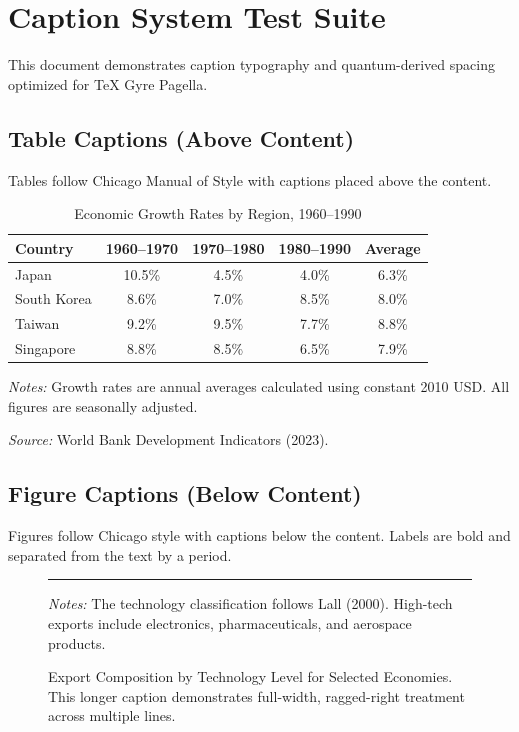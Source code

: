 \documentclass[11pt,a4paper]{article}
\begin{document}
\section{Caption System Test Suite}

This document demonstrates caption typography and quantum-derived spacing optimized for TeX Gyre Pagella.

\subsection{Table Captions (Above Content)}

Tables follow Chicago Manual of Style with captions placed above the content.

\begin{table}[tbp]
  \caption{Economic Growth Rates by Region, 1960–1990}
  \label{tab:growth-rates}
  \centering
  \begin{threeparttable}
    \begin{tabular}{@{}lcccc@{}}
      \toprule
      Country & 1960–1970 & 1970–1980 & 1980–1990 & Average \\
      \midrule
      Japan & 10.5\% & 4.5\% & 4.0\% & 6.3\% \\
      South Korea & 8.6\% & 7.0\% & 8.5\% & 8.0\% \\
      Taiwan & 9.2\% & 9.5\% & 7.7\% & 8.8\% \\
      Singapore & 8.8\% & 8.5\% & 6.5\% & 7.9\% \\
      \bottomrule
    \end{tabular}
    \begin{tablenotes}
      \item \emph{Notes:} Growth rates are annual averages calculated using constant 2010 USD. All figures are seasonally adjusted.
      \item \emph{Source:} World Bank Development Indicators (2023).
    \end{tablenotes}
  \end{threeparttable}
\end{table}

\subsection{Figure Captions (Below Content)}

Figures follow Chicago style with captions below the content. Labels are bold and separated from the text by a period.

\begin{figure}[tbp]
  \centering
  \rule{0.8\textwidth}{0.4\textwidth}%
  \caption{Export Composition by Technology Level for Selected Economies. This longer caption demonstrates full-width, ragged-right treatment across multiple lines.}
  \label{fig:export-comp}
  \begin{lanepaperfigurenotes}
    \emph{Notes:} The technology classification follows Lall (2000). High-tech exports include electronics, pharmaceuticals, and aerospace products.
  \end{lanepaperfigurenotes}
\end{figure}
\end{document}
